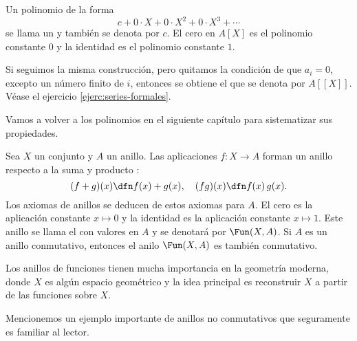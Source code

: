 \begin{ejemplo}
  Un polinomio de la forma
  $$c + 0\cdot X + 0\cdot X^2 + 0\cdot X^3 + \cdots$$
  se llama un  y también se denota por $c$. El cero en
  $A [X]$ es el polinomio constante $0$ y la identidad es el polinomio constante
  $1$.

  Si seguimos la misma construcción, pero quitamos la condición de que
  $a_i = 0$, excepto un número finito de $i$, entonces se obtiene el
   que se denota por $A[\![X]\!]$. Véase el
  ejercicio \ref{ejerc:series-formales}.
\end{ejemplo}

Vamos a volver a los polinomios en el siguiente capítulo para sistematizar sus
propiedades.

\begin{ejemplo}
  Sea $X$ un conjunto y $A$ un anillo. Las aplicaciones $f\colon X\to A$ forman
  un anillo respecto a la suma y producto :
  $$(f+g) (x) \dfn f (x) + g (x), \quad (fg) (x) \dfn f (x) \, g (x).$$
  Los axiomas de anillos se deducen de estos axiomas para $A$. El cero es
  la aplicación constante $x \mapsto 0$ y la identidad es la aplicación
  constante $x \mapsto 1$. Este anillo se llama el
   con valores en $A$ y se denotará por
  $\Fun (X,A)$. Si $A$ es un anillo conmutativo, entonces el anilo $\Fun (X,A)$
  es también conmutativo.

  Los anillos de funciones tienen mucha importancia en la geometría moderna,
  donde $X$ es algún espacio geométrico y la idea principal es reconstruir $X$ a
  partir de las funciones sobre $X$.
\end{ejemplo}

Mencionemos un ejemplo importante de anillos no conmutativos que seguramente es
familiar al lector.

